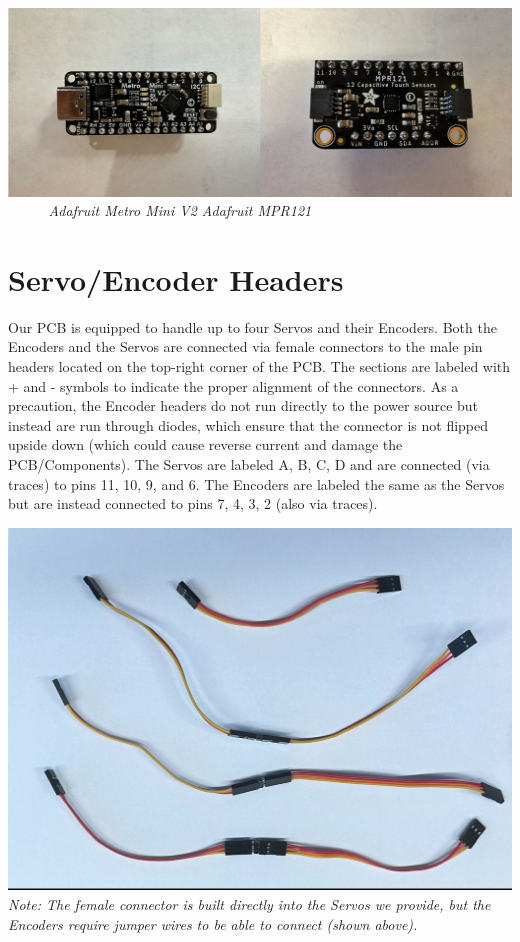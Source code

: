\documentclass{article}
\begin{document}
\begin{center}
    \includegraphics[scale=0.25]{Images/metroandmpr.jpg}
    \\[1ex] %
    \textit{$\>$ $\>$ $\>$ $\>$ $\>$ Adafruit Metro Mini V2 \tab Adafruit MPR121}
\end{center}
\section{Servo/Encoder Headers}
Our PCB is equipped to handle up to four Servos and their Encoders. Both the Encoders and the Servos are connected via female connectors to the male pin headers located on the top-right corner of the PCB. The sections are labeled with + and - symbols to indicate the proper alignment of the connectors. As a precaution, the Encoder headers do not run directly to the power source but instead are run through diodes, which ensure that the connector is not flipped upside down (which could cause reverse current and damage the PCB/Components). The Servos are labeled A, B, C, D and are connected (via traces) to pins 11, 10, 9, and 6. The Encoders are labeled the same as the Servos but are instead connected to pins 7, 4, 3, 2 (also via traces).\\
\begin{center}
    \includegraphics[scale=0.17]{Images/EncoderJumpersCropped.png}
    \\[1ex] %
    \textit{Note: The female connector is built directly into the Servos we provide, but the Encoders require jumper wires to be able to connect (shown above).}
\end{center}
\end{document}
